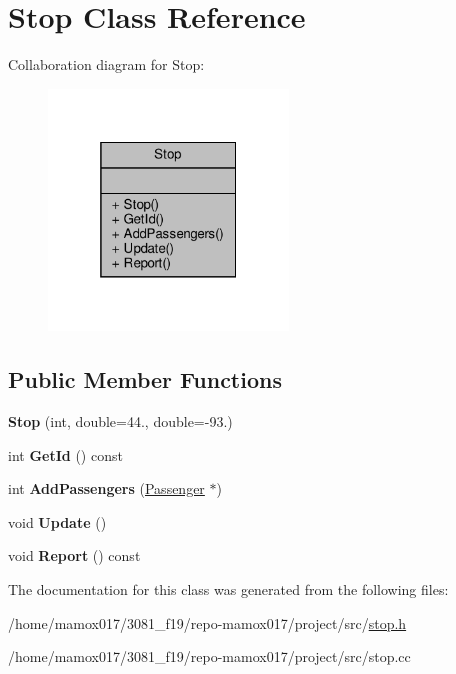 \hypertarget{classStop}{}\section{Stop Class Reference}
\label{classStop}


Collaboration diagram for Stop\+:
\nopagebreak
\begin{figure}[H]
\begin{center}
\leavevmode
\includegraphics[width=181pt]{classStop__coll__graph}
\end{center}
\end{figure}
\subsection*{Public Member Functions}
\begin{DoxyCompactItemize}
\item 
\mbox{\label{classStop_a59d881f072b1cf89512bb15a51ffc773}} 
{\bfseries Stop} (int, double=44., double=-\/93.)
\item 
\mbox{\label{classStop_a2f3b845d5a338f197226c90696314904}} 
int {\bfseries Get\+Id} () const
\item 
\mbox{\label{classStop_a20a8b6035679d92a7a838a03a102bcd1}} 
int {\bfseries Add\+Passengers} (\hyperlink{classPassenger}{Passenger} $\ast$)
\item 
\mbox{\label{classStop_aa373ae256ce6bc01ef13e876dfdec5bd}} 
void {\bfseries Update} ()
\item 
\mbox{\label{classStop_a913202b0c6d4bad1498873251d5d2a2f}} 
void {\bfseries Report} () const
\end{DoxyCompactItemize}


The documentation for this class was generated from the following files\+:\begin{DoxyCompactItemize}
\item 
/home/mamox017/3081\+\_\+f19/repo-\/mamox017/project/src/\hyperlink{stop_8h}{stop.\+h}\item 
/home/mamox017/3081\+\_\+f19/repo-\/mamox017/project/src/stop.\+cc\end{DoxyCompactItemize}
